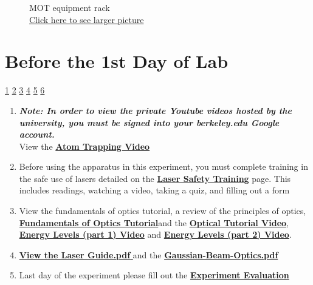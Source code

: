 \documentclass{../lab}
\begin{document}
\begin{figure}[H]
  \caption{MOT equipment rack\\ \href{http://dev-physicsadv.pantheon.berkeley.edu/sites/default/files/IMG_4086.JPG}{Click here to see larger picture}}\label{fig:IMG_4086.JPG}
\endminipage
\end{figure}

\section{Before the 1st Day of Lab}

\signatures \hyperlink{Power}{1} \hyperlink{Two Quarter-Wave Plates}{2} \hyperlink{Four Peaks}{3} \hyperlink{Adjustments}{4} \hyperlink{Results and Steps}{5} \hyperlink{Methods of Measuring Temperature}{6}

\begin{enumerate}
    \item \emph{\textbf{Note: In order to view the private Youtube videos hosted by the university, you must be signed into your berkeley.edu Google account.}}\\
    View the \href{http://youtu.be/1n4QumeydQ4}{\textbf{Atom Trapping Video}}

    \item Before using the apparatus in this experiment, you must complete training in the safe use of lasers detailed on the \href{http://experimentationlab.berkeley.edu/LaserSafety}{\textbf{Laser Safety Training}} page. This includes readings, watching a video, taking a quiz, and filling out a form

    \item View the fundamentals of optics tutorial, a review of the principles of optics,\textbf{ }\href{http://experimentationlab.berkeley.edu/sites/default/files/QIE/fundamental-Optics.pdf}{\textbf{\textbf{Fundamentals of Optics Tutorial}}}and the \href{http://youtu.be/zUGBt5vc5FA}{\textbf{Optical Tutorial Video}}, \href{http://youtu.be/wyBOVjU5bBQ}{\textbf{Energy Levels (part 1) Video}} and \href{http://youtu.be/Eypw0DmVBxk}{\textbf{Energy Levels (part 2) Video}}.

    \item \href{http://experimentationlab.berkeley.edu/sites/default/files/MOT/Laser-Guide.pdf}{\textbf{\textbf{View the Laser Guide.pdf }}}and the \href{http://experimentationlab.berkeley.edu/sites/default/files/MOT/Gaussian-Beam-Optics.pdf}{\textbf{Gaussian-Beam-Optics.pdf}}

    \item Last day of the experiment please fill out the \href{\ExperimentEvaluation}{\textbf{Experiment Evaluation}}
\end{enumerate}
\end{document}
